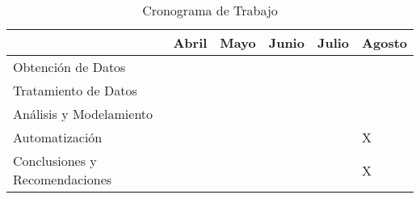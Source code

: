 \documentclass[10pt,a4paper]{article}
\begin{document}
\begin{table}[h!]
\centering
\label{Cronograma}
\begin{tabular}{|m{2.5cm} *{5}{|m{0.95cm}}|}
\hline
       & Abril   & Mayo   & Junio   & Julio & Agosto  \\ \hline
Obtención de Datos   &   &   &   &  &  \\ \hline
Tratamiento de Datos  &   &   &   &  &  \\ \hline
Análisis y Modelamiento &   &  &   &  &  \\ \hline
Automatización  &   &   &   &  & X \\ \hline
Conclusiones y Recomendaciones  &   &   &   &  & X \\ 

\hline
\end{tabular}
\caption{Cronograma de Trabajo}
\end{table}


\newpage


\end{document}
